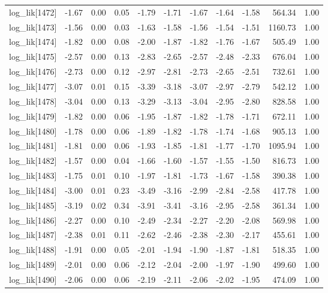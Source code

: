 \begin{table}[ht]
\begin{tabular}{rrrrrrrrrrr}
  log\_lik[1472] & -1.67 & 0.00 & 0.05 & -1.79 & -1.71 & -1.67 & -1.64 & -1.58 & 564.34 & 1.00 \\ 
  log\_lik[1473] & -1.56 & 0.00 & 0.03 & -1.63 & -1.58 & -1.56 & -1.54 & -1.51 & 1160.73 & 1.00 \\ 
  log\_lik[1474] & -1.82 & 0.00 & 0.08 & -2.00 & -1.87 & -1.82 & -1.76 & -1.67 & 505.49 & 1.00 \\ 
  log\_lik[1475] & -2.57 & 0.00 & 0.13 & -2.83 & -2.65 & -2.57 & -2.48 & -2.33 & 676.04 & 1.00 \\ 
  log\_lik[1476] & -2.73 & 0.00 & 0.12 & -2.97 & -2.81 & -2.73 & -2.65 & -2.51 & 732.61 & 1.00 \\ 
  log\_lik[1477] & -3.07 & 0.01 & 0.15 & -3.39 & -3.18 & -3.07 & -2.97 & -2.79 & 542.12 & 1.00 \\ 
  log\_lik[1478] & -3.04 & 0.00 & 0.13 & -3.29 & -3.13 & -3.04 & -2.95 & -2.80 & 828.58 & 1.00 \\ 
  log\_lik[1479] & -1.82 & 0.00 & 0.06 & -1.95 & -1.87 & -1.82 & -1.78 & -1.71 & 672.11 & 1.00 \\ 
  log\_lik[1480] & -1.78 & 0.00 & 0.06 & -1.89 & -1.82 & -1.78 & -1.74 & -1.68 & 905.13 & 1.00 \\ 
  log\_lik[1481] & -1.81 & 0.00 & 0.06 & -1.93 & -1.85 & -1.81 & -1.77 & -1.70 & 1095.94 & 1.00 \\ 
  log\_lik[1482] & -1.57 & 0.00 & 0.04 & -1.66 & -1.60 & -1.57 & -1.55 & -1.50 & 816.73 & 1.00 \\ 
  log\_lik[1483] & -1.75 & 0.01 & 0.10 & -1.97 & -1.81 & -1.73 & -1.67 & -1.58 & 390.38 & 1.00 \\ 
  log\_lik[1484] & -3.00 & 0.01 & 0.23 & -3.49 & -3.16 & -2.99 & -2.84 & -2.58 & 417.78 & 1.00 \\ 
  log\_lik[1485] & -3.19 & 0.02 & 0.34 & -3.91 & -3.41 & -3.16 & -2.95 & -2.58 & 361.34 & 1.00 \\ 
  log\_lik[1486] & -2.27 & 0.00 & 0.10 & -2.49 & -2.34 & -2.27 & -2.20 & -2.08 & 569.98 & 1.00 \\ 
  log\_lik[1487] & -2.38 & 0.01 & 0.11 & -2.62 & -2.46 & -2.38 & -2.30 & -2.17 & 455.61 & 1.00 \\ 
  log\_lik[1488] & -1.91 & 0.00 & 0.05 & -2.01 & -1.94 & -1.90 & -1.87 & -1.81 & 518.35 & 1.00 \\ 
  log\_lik[1489] & -2.01 & 0.00 & 0.06 & -2.12 & -2.04 & -2.00 & -1.97 & -1.90 & 499.60 & 1.00 \\ 
  log\_lik[1490] & -2.06 & 0.00 & 0.06 & -2.19 & -2.11 & -2.06 & -2.02 & -1.95 & 474.09 & 1.00 \\ 

\end{tabular}
\end{table}
